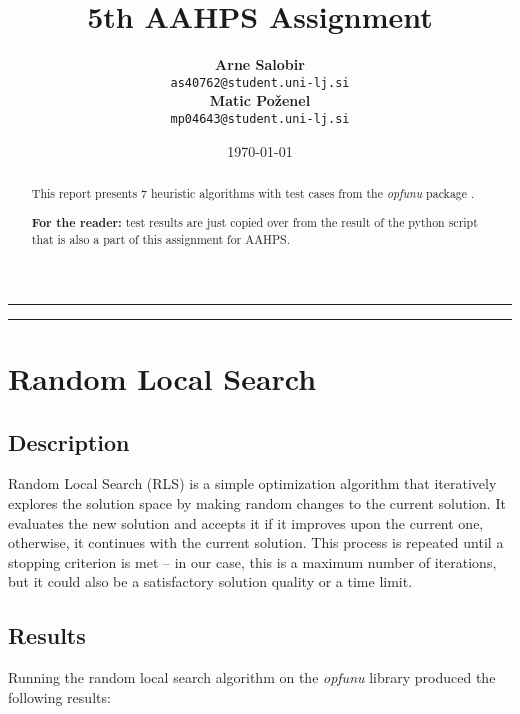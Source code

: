 \documentclass{article}
\title{\LARGE \textbf{5th AAHPS Assignment}}
\author{
  \textbf{Arne Salobir} \\
  \texttt{as40762@student.uni-lj.si} \\[0.5em]
  \textbf{Matic Poženel} \\
  \texttt{mp04643@student.uni-lj.si}
}
\date{\today}
\begin{document}
\maketitle

\hrule

\begin{abstract}
  This report presents 7 heuristic algorithms with test cases
  from the \textit{opfunu} package \cite{opfunu}.

  \textbf{For the reader:} test results are just copied over from the
  result of the python script that is also a part of this assignment for AAHPS.
\end{abstract}

\vspace{1em}

\hrule

\tableofcontents

\newpage

\section{Random Local Search}

\subsection{Description}

Random Local Search (RLS) is a simple optimization algorithm that
iteratively explores the solution space by making random changes to
the current solution. It evaluates the new solution and accepts it if
it improves upon the current one, otherwise, it continues with the
current solution. This process is repeated until a stopping criterion
is met -- in our case, this is a maximum number of iterations, but it
could also be a satisfactory solution quality or a time limit.

\subsection{Results}

Running the random local search algorithm on the \textit{opfunu} library
produced the following results:
\end{document}
